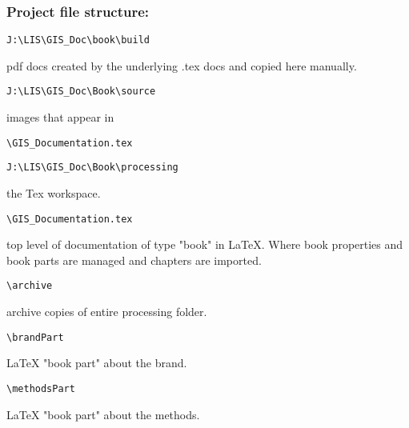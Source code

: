 \documentclass[class=book , crop=false]{standalone}
\begin{document}
\subsubsection{Project file structure:}
\begin{verbatim}
J:\LIS\GIS_Doc\book\build
\end{verbatim}
\begin{description}
\item pdf docs created by the underlying .tex docs and copied here manually.
\end{description}
\begin{verbatim}
J:\LIS\GIS_Doc\Book\source
\end{verbatim}
\begin{description}
\item images that appear in
\begin{verbatim}
\GIS_Documentation.tex
\end{verbatim}
\end{description}
\begin{verbatim}
J:\LIS\GIS_Doc\Book\processing
\end{verbatim}
\begin{description}
\item the Tex workspace.
\end{description}
\begin{verbatim}
\GIS_Documentation.tex
\end{verbatim}
\begin{description}
\item top level of documentation of type "book" in \LaTeX{}.  Where book properties and book parts are managed and chapters are imported.
\end{description}
\begin{verbatim}
\archive
\end{verbatim}
\begin{description}
\item archive copies of entire processing folder.
\end{description}
\begin{verbatim}
\brandPart
\end{verbatim}
\begin{description}
\item \LaTeX{} "book part" about the brand.
\end{description}
\begin{verbatim}
\methodsPart
\end{verbatim}
\begin{description}
\item \LaTeX{} "book part" about the methods.
\end{description}
\end{document}

